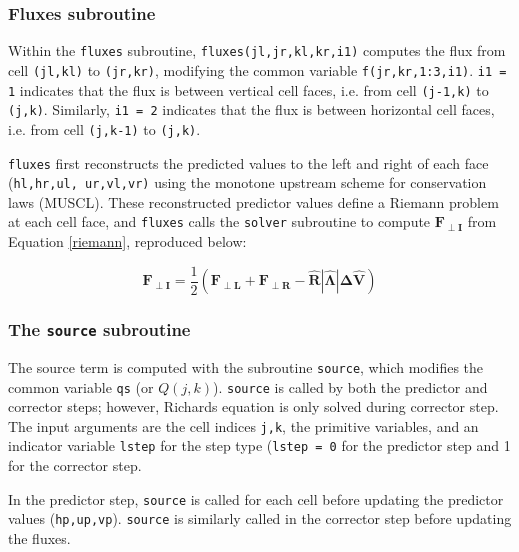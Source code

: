 \documentclass{article}
\newcommand{\code}[1]{\texttt{#1}}
\begin{document}
\subsubsection*{Fluxes subroutine}

Within the \code{fluxes} subroutine, \code{fluxes(jl,jr,kl,kr,i1)} computes the flux from cell \code{(jl,kl)} to \code{(jr,kr)}, modifying the common variable \code{f(jr,kr,1:3,i1)}. 
\code{i1 = 1} indicates that the flux is between vertical cell faces, i.e. from cell \code{(j-1,k)} to \code{(j,k)}.
Similarly, \code{i1 = 2} indicates that the flux is between horizontal cell faces, i.e. from cell \code{(j,k-1)} to \code{(j,k)}.

 
\code{fluxes}  first reconstructs the predicted values to the left and right of each face (\code{hl,hr,ul, ur,vl,vr)} using the monotone upstream scheme for conservation laws (MUSCL).  These reconstructed predictor values define a Riemann problem at each cell face, and \code{fluxes} calls the \code{solver} subroutine to compute $\mathbf{F_{\perp I}}$ from Equation \ref{riemann}, reproduced below:

\begin{equation*}
\mathbf{F_{\perp I}} =
	 \frac{1}{2} (\mathbf{F_{\perp L}} + \mathbf{F_{\perp R}} - \mathbf{\hat{R} |\hat{\Lambda}| \Delta \hat V  })
\end{equation*}


\subsubsection*{The \code{source} subroutine}

 The source term is computed with the subroutine \code{source}, which modifies the common variable \code{qs} (or $Q(j,k)$).
  \code{source} is called by both the predictor and corrector steps; however, Richards equation is only solved during corrector step. 
 The input arguments are the  cell indices \code{j,k}, the primitive variables, and an indicator variable \code{lstep} for the step type (\code{lstep = 0} for the predictor step and 1 for the corrector step.		
 
In the predictor step, \code{source} is called for each cell before updating the predictor values (\code{hp,up,vp}).  \code{source} is similarly  called in the corrector step before updating the fluxes.
\end{document}
